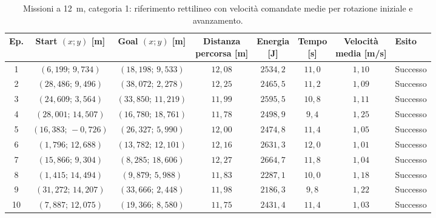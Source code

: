 \begin{table}[H]
\centering
\caption{Missioni a 12~m, categoria 1: riferimento rettilineo con velocità comandate medie per rotazione iniziale e avanzamento.}
\label{tab:big-map-12m-baseline-cat1}
\begingroup
\fontsize{9}{11}\selectfont
\setlength{\tabcolsep}{2.5pt}
\renewcommand{\arraystretch}{1.2}
\begin{tabular}{@{}c cc cccc l@{}}
\toprule
Ep. & \shortstack{Start $(x;y)$\\{}[m]} & \shortstack{Goal $(x;y)$\\{}[m]} & \shortstack{Distanza\\percorsa [m]} & \shortstack{Energia\\{}[J]} & \shortstack{Tempo\\{}[s]} & \shortstack{Velocità\\media [m/s]} & Esito \\
\midrule
1 & $(6{,}199;\,9{,}734)$ & $(18{,}198;\,9{,}533)$ & $12{,}08$ & $2534{,}2$ & $11{,}0$ & $1{,}10$ & Successo \\
2 & $(28{,}486;\,9{,}496)$ & $(38{,}072;\,2{,}278)$ & $12{,}25$ & $2465{,}5$ & $11{,}2$ & $1{,}09$ & Successo \\
3 & $(24{,}609;\,3{,}564)$ & $(33{,}850;\,11{,}219)$ & $11{,}99$ & $2595{,}5$ & $10{,}8$ & $1{,}11$ & Successo \\
4 & $(28{,}001;\,14{,}507)$ & $(16{,}780;\,18{,}761)$ & $11{,}78$ & $2498{,}9$ & $9{,}4$ & $1{,}25$ & Successo \\
5 & $(16{,}383;\,-0{,}726)$ & $(26{,}327;\,5{,}990)$ & $12{,}00$ & $2474{,}8$ & $11{,}4$ & $1{,}05$ & Successo \\
6 & $(1{,}796;\,12{,}688)$ & $(13{,}782;\,12{,}101)$ & $12{,}16$ & $2631{,}3$ & $12{,}0$ & $1{,}01$ & Successo \\
7 & $(15{,}866;\,9{,}304)$ & $(8{,}285;\,18{,}606)$ & $12{,}27$ & $2664{,}7$ & $11{,}8$ & $1{,}04$ & Successo \\
8 & $(1{,}415;\,14{,}494)$ & $(9{,}879;\,5{,}988)$ & $11{,}83$ & $2287{,}1$ & $10{,}0$ & $1{,}18$ & Successo \\
9 & $(31{,}272;\,14{,}207)$ & $(33{,}666;\,2{,}448)$ & $11{,}98$ & $2186{,}3$ & $9{,}8$ & $1{,}22$ & Successo \\
10 & $(7{,}887;\,12{,}075)$ & $(19{,}366;\,8{,}580)$ & $11{,}75$ & $2431{,}4$ & $11{,}4$ & $1{,}03$ & Successo \\
\bottomrule
\end{tabular}
\endgroup
\end{table}


